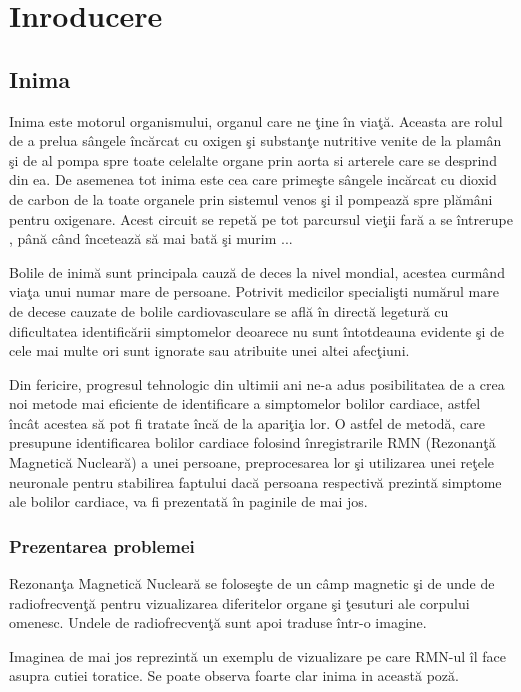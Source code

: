 \chapter{Inroducere}

\section{Inima}

Inima este motorul organismului, organul care ne \c{t}ine \^{i}n via\c{t}\u{a}. Aceasta are rolul de a prelua s\^{a}ngele \^{i}nc\u{a}rcat cu oxigen \c{s}i substan\c{t}e nutritive venite de la plam\^{a}n \c{s}i de al pompa spre toate celelalte organe prin aorta si arterele care se desprind din ea. De asemenea tot inima este cea care prime\c{s}te s\^{a}ngele inc\u{a}rcat cu dioxid de carbon de la toate organele prin sistemul venos \c{s}i il pompeaz\u{a} spre pl\u{a}m\^{a}ni pentru oxigenare. Acest circuit se repet\u{a} pe tot parcursul vie\c{t}ii far\u{a} a se \^{i}ntrerupe , p\^{a}n\u{a} c\^{a}nd \^{i}nceteaz\u{a} s\u{a} mai bat\u{a} \c{s}i murim ...
\par 
Bolile de inim\u{a} sunt principala cauz\u{a} de deces la nivel mondial, acestea curm\^{a}nd via\c{t}a unui numar mare de persoane. Potrivit medicilor speciali\c{s}ti num\u{a}rul mare de decese cauzate de bolile cardiovasculare se afl\u{a} \^{i}n direct\u{a} legetur\u{a} cu dificultatea identific\u{a}rii simptomelor deoarece nu sunt \^{i}ntotdeauna evidente \c{s}i de cele mai multe ori sunt ignorate sau atribuite unei altei afec\c{t}iuni.
\par 
Din fericire, progresul tehnologic din ultimii ani ne-a adus posibilitatea de a crea noi metode mai eficiente de identificare a simptomelor bolilor cardiace, astfel \^{i}nc\^{a}t acestea s\u{a} pot fi tratate \^{i}nc\u{a} de la apari\c{t}ia lor. O astfel de metod\u{a}, care presupune identificarea bolilor cardiace folosind \^{i}nregistrarile RMN (Rezonan\c{t}\u{a} Magnetic\u{a} Nuclear\u{a}) a unei persoane, preprocesarea lor \c{s}i utilizarea unei re\c{t}ele neuronale pentru stabilirea faptului dac\u{a} persoana respectiv\u{a} prezint\u{a} simptome ale bolilor cardiace, va fi prezentat\u{a} \^{i}n paginile de mai jos. 

\subsection{Prezentarea problemei}

Rezonan\c{t}a Magnetic\u{a} Nuclear\u{a} se folose\c{s}te de un c\^{a}mp magnetic \c{s}i de unde de radiofrecven\c{t}\u{a} pentru vizualizarea diferitelor organe \c{s}i \c{t}esuturi ale corpului omenesc. Undele de radiofrecven\c{t}\u{a} sunt apoi traduse \^{i}ntr-o imagine.
\par
Imaginea de mai jos reprezint\u{a} un exemplu de vizualizare pe care RMN-ul \^{i}l face asupra cutiei toratice. Se poate observa foarte clar inima in aceast\u{a} poz\u{a}.

